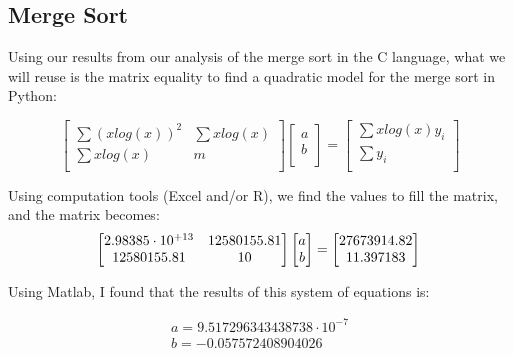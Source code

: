 \documentclass[]{report}
\begin{document}
		 		\subsection{Merge Sort}
		 		Using our results from our analysis of the merge sort in the C language, what we will reuse is the matrix equality to find a quadratic model for the merge sort in Python:
		 		
		 		\begin{equation}
						\begin{bmatrix}
						\sum (x log(x))^2 & \sum x log(x) \\
						\sum x log(x) & m \\
						\end{bmatrix}
						\begin{bmatrix}
						a \\
						b \\
						\end{bmatrix}
						=
						\begin{bmatrix}
						\sum x log(x) y_i\\
						\sum y_i \\
						\end{bmatrix}
				\end{equation}
				
				Using computation tools (Excel and/or R), we find the values to fill the matrix, and the matrix becomes:
				\\
				\begin{equation}
						\begin{bmatrix}
						2.98385 \cdot 10^{+13} & 12580155.81 \\
						12580155.81 & 10 \\
						\end{bmatrix}
						\begin{bmatrix}
						a \\
						b \\
						\end{bmatrix}
						=
						\begin{bmatrix}
						27673914.82 \\
						11.397183 \\
						\end{bmatrix} \\
				\end{equation}				
		 		
		 		Using Matlab, I found that the results of this system of equations is:
		 		
		 		\begin{equation}
		 			\begin{align}
						a = 9.517296343438738\cdot10^{-7}\\
						b = -0.057572408904026
		 			\end{align}
				\end{equation}
				
\end{document}
